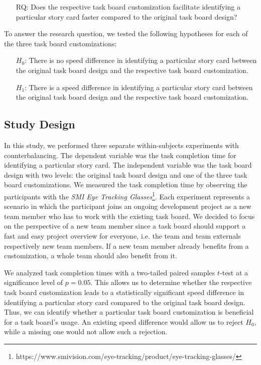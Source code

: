 \documentclass{llncs}
\begin{document}
\begin{itemize}[leftmargin=9mm]
	\item[RQ:] Does the respective task board customization facilitate 
	identifying a particular story card faster compared to the original task 
	board design?
\end{itemize}

To answer the research question, we tested the following hypotheses for each of 
the three task board customizations:

\begin{itemize}[leftmargin=8mm]
	\item[$H_{0}$:] There is no speed difference in identifying a particular 
	story card between the original task board design and the respective task 
	board customization.
	\item[$H_{1}$:] There is a speed difference in identifying a particular 
	story card between the original task board design and the respective task 
	board customization.
\end{itemize}

\subsection{Study Design}
In this study, we performed three separate within-subjects experiments with 
counterbalancing. The dependent variable was the task completion time for 
identifying a particular story card. The independent variable was the task 
board design with two levels: the original task board design and one of the 
three task board customizations. We measured the task completion time by 
observing the participants with the \textit{SMI Eye Tracking 
Glasses}\footnote{https://www.smivision.com/eye-tracking/product/eye-tracking-glasses/}.
 Each experiment represents a scenario in which the participant joins an 
ongoing development project as a new team member who has to work with the 
existing task board. We decided to focus on the perspective of a new team 
member since a task board should support a fast and easy project overview for 
everyone, i.e. the team and team externals respectively new team members. If a 
new team member already benefits from a customization, a whole team should also 
benefit from it.

We analyzed task completion times with a two-tailed paired samples $t$-test 
at a significance level of $p = 0.05$. This allows us to determine 
whether the respective task board customization leads to a statistically 
significant speed difference in identifying a particular story card compared 
to the original task board design. Thus, we can identify whether a particular 
task board customization is beneficial for a task board's usage. An existing 
speed difference would allow us to reject $H_{0}$, while a missing one would 
not allow such a rejection.
\end{document}
